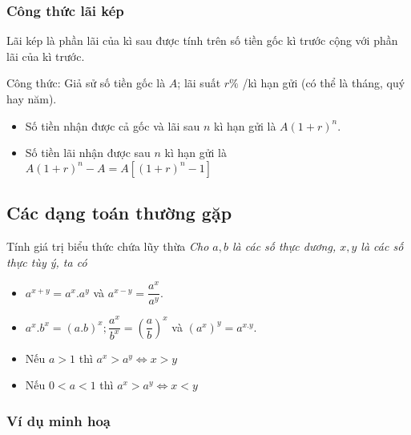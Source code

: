 \begin{tomtat}
\subsubsection{Công thức lãi kép}
\begin{dn}
	Lãi kép là phần lãi của kì sau được tính trên số tiền gốc kì trước cộng với phần lãi của kì trước.
\end{dn}
Công thức: Giả sử số tiền gốc là $A$; lãi suất $r\%$ /kì hạn gửi (có thể là tháng, quý hay năm).
\begin{itemize}
	\item Số tiền nhận được cả gốc và lãi sau $n$ kì hạn gửi là $A\left(1+r\right)^n$.
	\item Số tiền lãi nhận được sau $n$ kì hạn gửi là $A\left(1+r\right)^n-A=A\left[\left(1+r\right)^n-1\right]$
\end{itemize} 
\end{tomtat}
\subsection{Các dạng toán thường gặp}

\begin{dang}{Tính giá trị biểu thức chứa  lũy thừa}
	\textit{Cho $a, b$ là các số thực dương, $x, y$ là các số thực tùy ý, ta có}
	\begin{itemize}
		\item ${a}^{x+y}=a^x.a^y$ và ${a}^{x-y}=\dfrac{a^x}{a^y}$.
		\item $a^x.b^x=(a.b)^x; \dfrac{a^x}{b^x}={\left(\dfrac{a}{b}\right)}^x$ và $(a^x)^y={a}^{x.y}$.
		\item Nếu $a>1$ thì $a^x>a^y\Leftrightarrow x>y$
		\item Nếu $0<a<1$ thì $a^x>a^y\Leftrightarrow x<y$
	\end{itemize}
\end{dang}

\subsubsection{Ví dụ minh hoạ}

